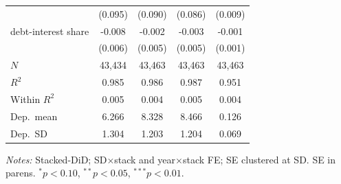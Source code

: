 \begin{table}[!htbp]
{\begin{tabular}{lcccc}
                      & (0.095) & (0.090) & (0.086) & (0.009) \\
    debt-interest share & -0.008 & -0.002 & -0.003 & -0.001 \\
                      & (0.006) & (0.005) & (0.005) & (0.001) \\
    \midrule
    $N$ & 43,434 & 43,463 & 43,463 & 43,463 \\
    $R^2$ & 0.985 & 0.986 & 0.987 & 0.951 \\
    Within $R^2$ & 0.005 & 0.004 & 0.005 & 0.004 \\
    Dep.\ mean & 6.266 & 8.328 & 8.466 & 0.126 \\
    Dep.\ SD & 1.304 & 1.203 & 1.204 & 0.069 \\
    \bottomrule
  \end{tabular}
  }
  \vspace{0.3em}
  \begin{minipage}{0.95\textwidth}
    \footnotesize \textit{Notes:} Stacked-DiD; SD$\times$stack and year$\times$stack FE; SE clustered at SD. SE in parens. $^{*}p<0.10$, $^{**}p<0.05$, $^{***}p<0.01$.
  \end{minipage}
\end{table}

